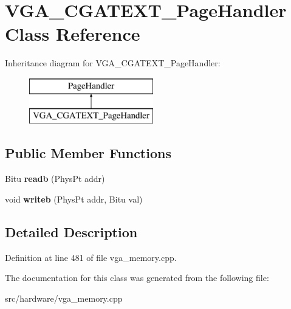 \hypertarget{classVGA__CGATEXT__PageHandler}{\section{V\-G\-A\-\_\-\-C\-G\-A\-T\-E\-X\-T\-\_\-\-Page\-Handler Class Reference}
\label{classVGA__CGATEXT__PageHandler}
}
Inheritance diagram for V\-G\-A\-\_\-\-C\-G\-A\-T\-E\-X\-T\-\_\-\-Page\-Handler\-:\begin{figure}[H]
\begin{center}
\leavevmode
\includegraphics[height=2.000000cm]{classVGA__CGATEXT__PageHandler}
\end{center}
\end{figure}
\subsection*{Public Member Functions}
\begin{DoxyCompactItemize}
\item 
\hypertarget{classVGA__CGATEXT__PageHandler_a37c43a069f9246f5fbc64d9328ab1d9f}{Bitu {\bfseries readb} (Phys\-Pt addr)}\label{classVGA__CGATEXT__PageHandler_a37c43a069f9246f5fbc64d9328ab1d9f}

\item 
\hypertarget{classVGA__CGATEXT__PageHandler_a3115b616f5ce1a32ff1b9b39aa6ec41a}{void {\bfseries writeb} (Phys\-Pt addr, Bitu val)}\label{classVGA__CGATEXT__PageHandler_a3115b616f5ce1a32ff1b9b39aa6ec41a}

\end{DoxyCompactItemize}


\subsection{Detailed Description}


Definition at line 481 of file vga\-\_\-memory.\-cpp.



The documentation for this class was generated from the following file\-:\begin{DoxyCompactItemize}
\item 
src/hardware/vga\-\_\-memory.\-cpp\end{DoxyCompactItemize}
